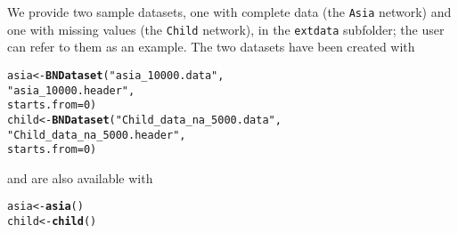 \documentclass{article}\usepackage[]{graphicx}\usepackage[]{color}
\makeatletter
\newcommand{\hlnum}[1]{\textcolor[rgb]{0.686,0.059,0.569}{#1}}%
\newcommand{\hlstr}[1]{\textcolor[rgb]{0.192,0.494,0.8}{#1}}%
\newcommand{\hlstd}[1]{\textcolor[rgb]{0.345,0.345,0.345}{#1}}%
\newcommand{\hlkwb}[1]{\textcolor[rgb]{0.69,0.353,0.396}{#1}}%
\newcommand{\hlkwc}[1]{\textcolor[rgb]{0.333,0.667,0.333}{#1}}%
\newcommand{\hlkwd}[1]{\textcolor[rgb]{0.737,0.353,0.396}{\textbf{#1}}}%
\newenvironment{kframe}{%
 \def\at@end@of@kframe{}%
 \ifinner\ifhmode%
  \def\at@end@of@kframe{\end{minipage}}%
  \begin{minipage}{\columnwidth}%
 \fi\fi%
 \def\FrameCommand##1{\hskip\@totalleftmargin \hskip-\fboxsep
 \colorbox{shadecolor}{##1}\hskip-\fboxsep
     \hskip-\linewidth \hskip-\@totalleftmargin \hskip\columnwidth}%
 \MakeFramed {\advance\hsize-\width
   \@totalleftmargin\z@ \linewidth\hsize
   \@setminipage}}%
 {\par\unskip\endMakeFramed%
 \at@end@of@kframe}
\newenvironment{knitrout}{}{} %
\makeatother
\begin{document}
We provide two sample datasets, one with complete data (the \texttt{Asia} network) and one with missing values
(the \texttt{Child} network), in the \texttt{extdata} subfolder;
the user can refer to them as an example. The two datasets have been created with

\begin{knitrout}
\color{fgcolor}\begin{kframe}
\begin{alltt}
\hlstd{asia} \hlkwb{<-} \hlkwd{BNDataset}\hlstd{(}\hlstr{"asia_10000.data"}\hlstd{,}
                  \hlstr{"asia_10000.header"}\hlstd{,}
                  \hlkwc{starts.from}\hlstd{=}\hlnum{0}\hlstd{)}
\hlstd{child} \hlkwb{<-} \hlkwd{BNDataset}\hlstd{(}\hlstr{"Child_data_na_5000.data"}\hlstd{,}
                   \hlstr{"Child_data_na_5000.header"}\hlstd{,}
                   \hlkwc{starts.from}\hlstd{=}\hlnum{0}\hlstd{)}
\end{alltt}
\end{kframe}
\end{knitrout}

and are also available with

\begin{knitrout}
\color{fgcolor}\begin{kframe}
\begin{alltt}
\hlstd{asia}  \hlkwb{<-} \hlkwd{asia}\hlstd{()}
\hlstd{child} \hlkwb{<-} \hlkwd{child}\hlstd{()}
\end{alltt}
\end{kframe}
\end{knitrout}
\end{document}
